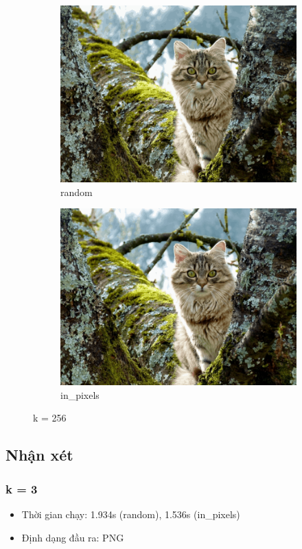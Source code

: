 \documentclass{article}
\begin{document}
\begin{figure}[ht!]
  \begin{subfigure}{.5\textwidth}
    \centering
    \includegraphics[width=.8\linewidth]{image/random_256.png}
    \caption{random}
    \label{fig:sfig9}
  \end{subfigure}%
  \begin{subfigure}{.5\textwidth}
    \centering
    \includegraphics[width=.8\linewidth]{image/in_256.png}
    \caption{in\_pixels}
    \label{fig:sfig10}
  \end{subfigure}
  \caption{k = 256}
  \label{fig:fig4}
\end{figure}

\pagebreak
\newpage
\subsection{Nhận xét}
\subsubsection{k = 3}
\begin{itemize}
  \item Thời gian chạy: 1.934s (random), 1.536s (in\_pixels)
  \item Định dạng đầu ra: PNG
\end{itemize}
\end{document}
